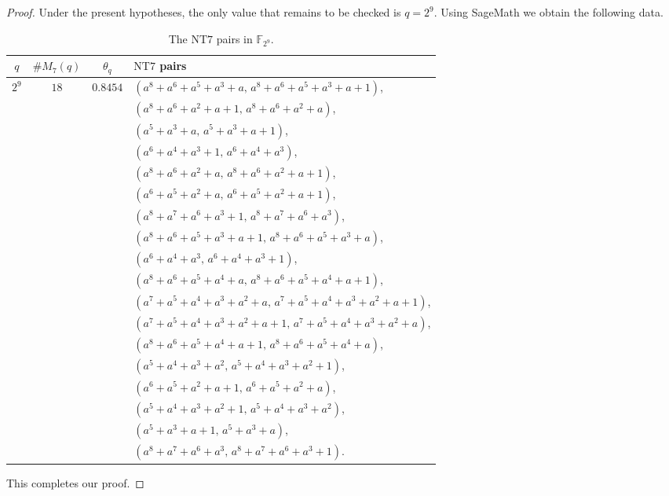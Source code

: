 \documentclass[10pt,a4paper]{amsart}
\begin{document}
\begin{proof}
Under the present hypotheses, the only value that remains to be checked is $q=2^9$. Using SageMath we obtain the following data.
\begin{table}[h]
\centering
\scriptsize
\begin{tabular}{c|c|c|p{8cm}}
$q$ & $\#M_7(q)$ & $\theta_q$ & $\mathrm{NT}7$ pairs \\ \hline
$2^9$ & $18$ & $0.8454$ &
$\left(a^8+a^6+a^5+a^3+a,\,
a^8+a^6+a^5+a^3+a+1\right)$, \\
&&&
$\left(a^8+a^6+a^2+a+1,\,
a^8+a^6+a^2+a\right)$, \\
&&&
$\left(a^5+a^3+a,\,
a^5+a^3+a+1\right)$, \\
&&&
$\left(a^6+a^4+a^3+1,\,
a^6+a^4+a^3\right)$, \\
&&&
$\left(a^8+a^6+a^2+a,\,
a^8+a^6+a^2+a+1\right)$, \\
&&&
$\left(a^6+a^5+a^2+a,\,
a^6+a^5+a^2+a+1\right)$, \\
&&&
$\left(a^8+a^7+a^6+a^3+1,\,
a^8+a^7+a^6+a^3\right)$, \\
&&&
$\left(a^8+a^6+a^5+a^3+a+1,\,
a^8+a^6+a^5+a^3+a\right)$, \\
&&&
$\left(a^6+a^4+a^3,\,
a^6+a^4+a^3+1\right)$, \\
&&&
$\left(a^8+a^6+a^5+a^4+a,\,
a^8+a^6+a^5+a^4+a+1\right)$, \\
&&&
$\left(a^7+a^5+a^4+a^3+a^2+a,\,
a^7+a^5+a^4+a^3+a^2+a+1\right)$, \\
&&&
$\left(a^7+a^5+a^4+a^3+a^2+a+1,\,
a^7+a^5+a^4+a^3+a^2+a\right)$, \\
&&&
$\left(a^8+a^6+a^5+a^4+a+1,\,
a^8+a^6+a^5+a^4+a\right)$, \\
&&&
$\left(a^5+a^4+a^3+a^2,\,
a^5+a^4+a^3+a^2+1\right)$, \\
&&&
$\left(a^6+a^5+a^2+a+1,\,
a^6+a^5+a^2+a\right)$, \\
&&&
$\left(a^5+a^4+a^3+a^2+1,\,
a^5+a^4+a^3+a^2\right)$, \\
&&&
$\left(a^5+a^3+a+1,\,
a^5+a^3+a\right)$, \\
&&&
$\left(a^8+a^7+a^6+a^3,\,
a^8+a^7+a^6+a^3+1\right)$.
\end{tabular}
\caption{The $\mathrm{NT}7$ pairs in $\mathbb{F}_{2^9}$.}
\label{tab:nt7}
\end{table}


This completes our proof.
\end{proof}
\end{document}
